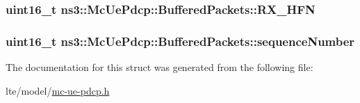 \subsubsection[{\texorpdfstring{R\+X\+\_\+\+H\+FN}{RX_HFN}}]{\setlength{\rightskip}{0pt plus 5cm}uint16\+\_\+t ns3\+::\+Mc\+Ue\+Pdcp\+::\+Buffered\+Packets\+::\+R\+X\+\_\+\+H\+FN}\hypertarget{structns3_1_1McUePdcp_1_1BufferedPackets_a7dbe9990fa912c880f84a5a9301395bf}{}\label{structns3_1_1McUePdcp_1_1BufferedPackets_a7dbe9990fa912c880f84a5a9301395bf}
\subsubsection[{\texorpdfstring{sequence\+Number}{sequenceNumber}}]{\setlength{\rightskip}{0pt plus 5cm}uint16\+\_\+t ns3\+::\+Mc\+Ue\+Pdcp\+::\+Buffered\+Packets\+::sequence\+Number}\hypertarget{structns3_1_1McUePdcp_1_1BufferedPackets_ab24391a3180a8d5eb77982a258048cab}{}\label{structns3_1_1McUePdcp_1_1BufferedPackets_ab24391a3180a8d5eb77982a258048cab}


The documentation for this struct was generated from the following file\+:\begin{DoxyCompactItemize}
\item 
lte/model/\hyperlink{lte_2model_2mc-ue-pdcp_8h}{mc-\/ue-\/pdcp.\+h}\end{DoxyCompactItemize}
